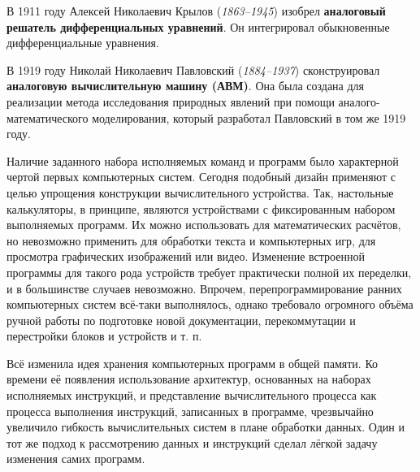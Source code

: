 \bigskip
В 1911 году Алексей Николаевич Крылов (\emph{1863--1945}) изобрел \textbf{аналоговый решатель дифференциальных уравнений}.
Он интегрировал обыкновенные дифференциальные уравнения.

\bigskip
В 1919 году Николай Николаевич Павловский (\emph{1884--1937}) сконструировал \textbf{аналоговую вычислительную машину (АВМ)}.
Она была создана для реализации метода исследования природных явлений при помощи аналого-математического моделирования, который разработал Павловский в том же 1919 году.

Наличие заданного набора исполняемых команд и программ было характерной чертой первых компьютерных систем.
Сегодня подобный дизайн применяют с целью упрощения конструкции вычислительного устройства.
Так, настольные калькуляторы, в принципе, являются устройствами с фиксированным набором выполняемых программ.
Их можно использовать для математических расчётов, но невозможно применить для обработки текста и компьютерных игр, для просмотра графических изображений или видео.
Изменение встроенной программы для такого рода устройств требует практически полной их переделки, и в большинстве случаев невозможно.
Впрочем, перепрограммирование ранних компьютерных систем всё-таки выполнялось, однако требовало огромного объёма ручной работы по подготовке новой документации, перекоммутации и перестройки блоков и устройств и т. п.

Всё изменила идея хранения компьютерных программ в общей памяти.
Ко времени её появления использование архитектур, основанных на наборах исполняемых инструкций, и представление вычислительного процесса как процесса выполнения инструкций, записанных в программе, чрезвычайно увеличило гибкость вычислительных систем в плане обработки данных.
Один и тот же подход к рассмотрению данных и инструкций сделал лёгкой задачу изменения самих программ.
